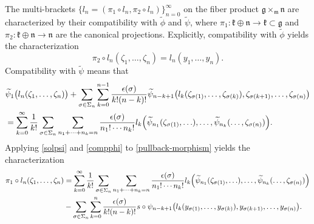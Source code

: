 \documentclass[12pt]{amsart}
\numberwithin{equation}{section}
\theoremstyle{plain}
\newcommand{\fg}{\mathfrak{g}}
\newcommand{\fk}{\mathfrak{k}}
\newcommand{\fn}{\mathfrak{n}}
\begin{document}
	The multi-brackets $\{l_n = (\pi_1 \circ l_n, \pi_2 \circ l_n)\}_{n=0}^\infty$ on the fiber product $\mathfrak{g} \times_{\mathfrak{m}} \mathfrak{n}$ are characterized by their compatibility with $\widetilde{\phi}$ and $\widetilde{\psi}$, where $\pi_1\colon \fk \oplus \fn \rightarrow \fk \subset \fg$ and $\pi_2\colon \fk \oplus \fn \rightarrow \fn$ are the canonical projections. Explicitly, compatibility with $\widetilde{\phi}$ yields the characterization
	\begin{equation}\label{compphi}
		\pi_2 \circ l_n(\zeta_1,\ldots,\zeta_n)
		=
		l_n(y_1, \dots, y_n).
	\end{equation}
	Compatibility with $\widetilde{\psi}$ means that
	\begin{equation}\label{pullback-morphism}
		\begin{aligned}
			&
			\widetilde{\psi}_1
			\bigl(
			l_n(\zeta_1,\ldots,\zeta_n)    
			\bigr)
			+
			\sum_{\sigma\in \Sigma_n}\sum_{k=0}^{n-1}
			\frac{\epsilon(\sigma)}{k!(n-k)!}
			\widetilde{\psi}_{n-k+1}
			\bigl(
			l_k(\zeta_{\sigma(1)},\ldots,\zeta_{\sigma(k)}),
			\zeta_{\sigma(k+1)},\ldots,\zeta_{\sigma(n)}
			\bigr)
			\\
			&=
			\sum_{k=0}^{\infty}
			\frac{1}{k!}
			\sum_{\sigma\in \Sigma_n}\sum_{n_1+\cdots+n_k=n}
			\frac{\epsilon(\sigma)}{n_1!\cdots n_k!}
			l_k
			\Bigl(
			\widetilde{\psi}_{n_1}(\zeta_{\sigma(1)},\ldots),
			\ldots,
			\widetilde{\psi}_{n_k}(\ldots,\zeta_{\sigma(n)})
			\Bigr).
		\end{aligned}
	\end{equation}
	Applying \eqref{solpsi} and \eqref{compphi} to \eqref{pullback-morphism} yields the characterization
	\[
	\begin{aligned}
		\pi_1 \circ l_n(\zeta_1,\ldots,\zeta_n) &=
		\sum_{k=0}^{\infty}
		\frac{1}{k!}
		\sum_{\sigma\in \Sigma_n}\sum_{n_1+\cdots+n_k=n}
		\frac{\epsilon(\sigma)}{n_1!\cdots n_k!}
		l_k
		\Bigl(
		\widetilde{\psi}_{n_1}(\zeta_{\sigma(1)},\ldots),
		\ldots,
		\widetilde{\psi}_{n_k}(\ldots,\zeta_{\sigma(n)})
		\Bigr) \\
		&-\sum_{\sigma\in \Sigma_n}\sum_{k=0}^n
		\frac{\epsilon(\sigma)}{k!(n-k)!}
		s \circ \psi_{n-k+1}
		\bigl(
		l_k(y_{\sigma(1)},\ldots,y_{\sigma(k)}),
		y_{\sigma(k+1)},\ldots, y_{\sigma(n)}
		\bigr).
	\end{aligned}
	\] 
	
\end{document}
